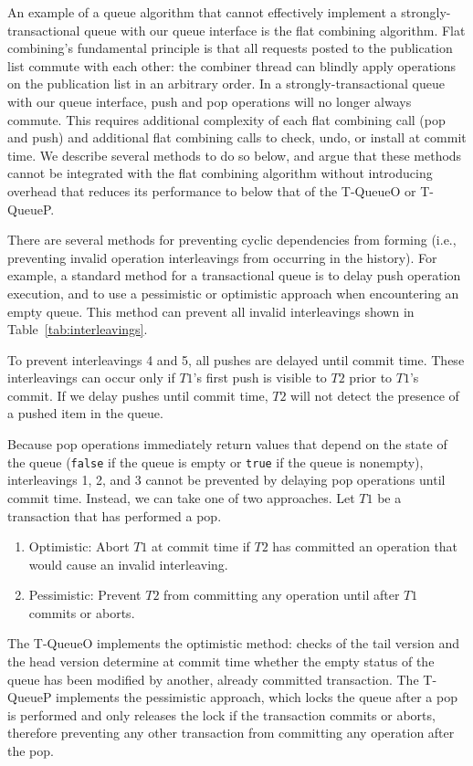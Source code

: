 An example of a queue algorithm that cannot effectively implement a strongly-transactional queue with our queue interface is the flat combining algorithm. 
Flat combining's fundamental principle is that all requests posted to the publication list commute with each other: the combiner thread can blindly apply operations on the publication list in an arbitrary order. In a strongly-transactional queue with our queue interface, push and pop operations will no longer always commute.
This requires additional complexity of each flat combining call (pop and push) and additional flat combining calls to check, undo, or install at commit time. We describe several methods to do so below, and argue that these methods cannot be integrated with the flat combining algorithm without introducing overhead that reduces its performance to below that of the T-QueueO or T-QueueP.

There are several methods for preventing cyclic dependencies from forming (i.e., preventing invalid operation interleavings from occurring in the history). For example, a standard method for a transactional queue is to delay push operation execution, and to use a pessimistic or optimistic approach when encountering an empty queue. This method can prevent all invalid interleavings shown in Table~\ref{tab:interleavings}.

To prevent interleavings 4 and 5, all pushes are delayed until commit time. These interleavings can occur only if $T1$'s first push is visible to $T2$ prior to $T1$'s commit. If we delay pushes until commit time, $T2$ will not detect the presence of a pushed item in the queue.

Because pop operations immediately return values that depend on the state of the queue (\texttt{false} if the queue is empty or \texttt{true} if the queue is nonempty), interleavings 1, 2, and 3 cannot be prevented by delaying pop operations until commit time. Instead, we can take one of two approaches. Let $T1$ be a transaction that has performed a pop.
\begin{enumerate}
    \item Optimistic: Abort $T1$ at commit time if $T2$ has committed an operation that would cause an invalid interleaving.
    \item Pessimistic: Prevent $T2$ from committing any operation until after $T1$ commits or aborts.
\end{enumerate}

The T-QueueO implements the optimistic method: checks of the tail version and the head version determine at commit time whether the empty status of the queue has been modified by another, already committed transaction. The T-QueueP implements the pessimistic approach, which locks the queue after a pop is performed and only releases the lock if the transaction commits or aborts, therefore preventing any other transaction from committing any operation after the pop.

